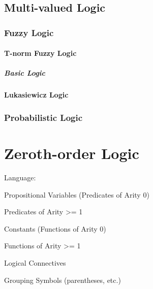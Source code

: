 \subsection{Multi-valued Logic}\label{sec:multi_valued_logic}

\subsubsection{Fuzzy Logic}\label{sec:fuzzy_logic}

\paragraph{T-norm Fuzzy Logic}\label{sec:tnorm_logic}\hfill

\subparagraph{Basic Logic}\label{sec:basic_logic}\hfill



\paragraph{Lukasiewicz Logic}\label{sec:lukasiewicz_logic}\hfill





\subsubsection{Probabilistic Logic}\label{sec:probabilistic_logic}



\section{Zeroth-order Logic}\label{sec:zerothorder_logic}


Language:

Propositional Variables (Predicates of Arity 0)

Predicates of Arity >= 1

Constants (Functions of Arity 0)

Functions of Arity >= 1

Logical Connectives

Grouping Symbols (parentheses, etc.)



